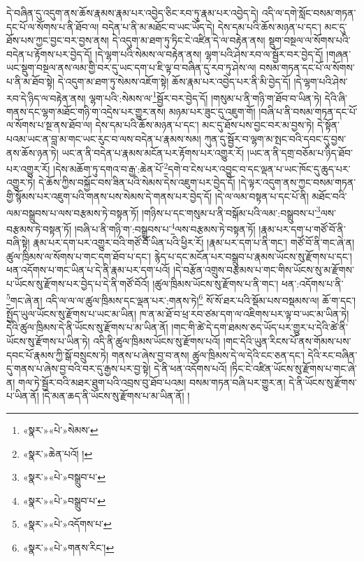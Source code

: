 དེ་བཞིན་དུ་འདུག་ནས་ཆོས་རྣམས་རྣམ་པར་འབྱེད་ཅིང་རབ་ཏུ་རྣམ་པར་འབྱེད་དེ། འདི་ལ་དགེ་སློང་བསམ་གཏན་དང་པོ་ལ་སོགས་པ་ནི་ཐོབ་ལ། བདེན་པ་ནི་མ་མཐོང་བ་ཡང་ཡོད་དེ། དེས་དམ་པའི་ཆོས་མཉན་པ་དང་། མང་དུ་ཐོས་པས་ཀྱང་བྱང་བར་བྱས་ནས། དེ་འདུག་མ་ཐག་ཏུ་ཏིང་ངེ་འཛིན་དེ་ལ་བརྟེན་ནས། སྡུག་བསྔལ་ལ་སོགས་པའི་བདེན་པ་རྟོགས་པར་བྱེད་དོ། །དེ་ལྷག་པའི་སེམས་ལ་བརྟེན་ནས། ལྷག་པའི་ཤེས་རབ་ལ་སྦྱོར་བར་བྱེད་དོ། །གཞན་ཡང་སྡུག་བསྔལ་ནས་ལམ་གྱི་བར་དུ་ཡང་དག་པ་ཇི་ལྟ་བ་བཞིན་དུ་རབ་ཏུ་ཤེས་ལ། བསམ་གཏན་དང་པོ་ལ་སོགས་པ་ནི་མ་ཐོབ་སྟེ། དེ་འདུག་མ་ཐག་ཏུ་སེམས་འཇོག་སྟེ། ཆོས་རྣམ་པར་འབྱེད་པར་ནི་མི་བྱེད་དོ། །དེ་ལྷག་པའི་ཤེས་རབ་དེ་ཉིད་ལ་བརྟེན་ནས། ལྷག་པའི་:སེམས་ལ་\footnote{«སྣར་»«པེ་»སེམས་}སྦྱོར་བར་བྱེད་དོ། །གསུམ་པ་ནི་གཉི་ག་ཐོབ་བ་ཡིན་ཏེ། དེའི་ཞི་གནས་དང་ལྷག་མཐོང་གཉི་ག་འདྲེས་པར་གྱུར་ནས། མཉམ་པར་ཟུང་དུ་འཇུག་གོ། །བཞི་པ་ནི་བསམ་གཏན་དང་པོ་ལ་སོགས་པ་སྔ་ནས་ཐོབ་ལ། དེས་དམ་པའི་ཆོས་མཉན་པ་དང་། མང་དུ་ཐོས་པས་བྱང་བར་མ་བྱས་ཏེ། དེ་སྟོན་པའམ་ཡང་ན་བླ་མ་གང་ཡང་རུང་བ་ལས་བདེན་པ་རྣམས་སམ། ཀུན་དུ་སྦྱོར་བ་ལྷག་མ་སྤང་བའི་དབང་དུ་བྱས་ནས་ཆོས་ཉན་ཏེ། ཡང་ན་ནི་བདེན་པ་རྣམས་མངོན་པར་རྟོགས་པར་འགྱུར་རོ། །ཡང་ན་ནི་དགྲ་བཅོམ་པ་ཉིད་ཐོབ་པར་འགྱུར་རོ། །དེས་མཆོག་ཏུ་དགའ་བ་རྒྱ་:ཆེན་པོ་\footnote{«སྣར་»ཆེན་པའོ། །}དགེ་བ་ངེས་པར་འབྱུང་བ་དང་ལྡན་པ་ཡང་ཁོང་དུ་ཆུད་པར་འགྱུར་ཏེ། དེ་ཆོས་ཀྱིས་བསྐྱོང་བས་ཟིན་པའི་སེམས་དེས་འཇུག་པར་བྱེད་དོ། །དེ་ལྟར་འདུག་ནས་ཀྱང་བསམ་གཏན་གྱི་སྙོམས་པར་འཇུག་པའི་གནས་པས་སེམས་དེ་གནས་པར་བྱེད་དོ། །དེ་ལ་ལམ་བསྟན་པ་དང་པོ་ནི། མཐོང་བའི་ལམ་བསྒྲུབས་པ་ལས་བརྩམས་ཏེ་བསྟན་ཏོ། །གཉིས་པ་དང་གསུམ་པ་ནི་བསྒོམ་པའི་ལམ་:བསྒྲུབས་པ་\footnote{«སྣར་»«པེ་»བསྒྲུབ་པ་}ལས་བརྩམས་ཏེ་བསྟན་ཏོ། །བཞི་པ་ནི་གཉི་ག་:བསྒྲུབས་པ་\footnote{«སྣར་»«པེ་»བསྒྲུབ་པ་}ལས་བརྩམས་ཏེ་བསྟན་ཏོ། །རྣམ་པར་དག་པ་གཙོ་བོ་ནི་བཞི་སྟེ། རྣམ་པར་དག་པར་འགྱུར་བའི་གཙོ་བོ་ཡིན་པའི་ཕྱིར་རོ། །རྣམ་པར་དག་པ་ནི་གང་། གཙོ་བོ་ནི་གང་ཞེ་ན། ཚུལ་ཁྲིམས་ལ་སོགས་པ་གང་དག་ཐོབ་པ་དང་། རྙེད་པ་དང་མངོན་པར་བསྒྲུབ་པ་རྣམས་ཡོངས་སུ་རྫོགས་པ་དང་། ཕན་འདོགས་པ་གང་ཡིན་པ་དེ་ནི་རྣམ་པར་དག་པའོ། །དེ་བརྩོན་འགྲུས་བརྩམས་པ་གང་གིས་ཡོངས་སུ་མ་རྫོགས་པ་ཡོངས་སུ་རྫོགས་པར་བྱེད་པ་དེ་ནི་གཙོ་བོའོ། །ཚུལ་ཁྲིམས་ཡོངས་སུ་རྫོགས་པ་ནི་གང་། ཕན་:འདོགས་པ་ནི་\footnote{«སྣར་»«པེ་»འདོགས་པ་}གང་ཞེ་ན། འདི་ལ་ལ་ལ་ཚུལ་ཁྲིམས་དང་ལྡན་པར་:གནས་ཏེ།\footnote{«སྣར་»«པེ་»གནས་རིང་།} སོ་སོ་ཐར་པའི་སྡོམ་པས་བསྡམས་ལ། ཆོ་ག་དང་། སྤྱོད་ཡུལ་ཡོངས་སུ་རྫོགས་པ་ཡང་མ་ཡིན། ཁ་ན་མ་ཐོ་བ་ཕྲ་རབ་ཙམ་དག་ལ་འཇིགས་པར་ལྟ་བ་ཡང་མ་ཡིན་ཏེ། དེའི་ཚུལ་ཁྲིམས་དེ་ནི་ཡོངས་སུ་རྫོགས་པ་མ་ཡིན་ནོ། །གང་གི་ཚེ་དེ་དག་ཐམས་ཅད་ཡོད་པར་གྱུར་པ་དེའི་ཚེ་ནི་ཡོངས་སུ་རྫོགས་པ་ཡིན་ཏེ། འདི་ནི་ཚུལ་ཁྲིམས་ཡོངས་སུ་རྫོགས་པའོ། །གང་དེའི་ཡུན་རིངས་པོ་ནས་གོམས་པས་དབང་པོ་རྣམས་ཀྱི་སྒོ་བསྲུངས་ཏེ། གནས་པ་ཞེས་བྱ་བ་ནས། ཚུལ་ཁྲིམས་དེ་ལ་དེའི་ངང་ཅན་དང་། དེའི་རང་བཞིན་དུ་གནས་པ་ཞེས་བྱ་བའི་བར་དུ་རྒྱས་པར་བྱ་སྟེ། དེ་ནི་ཕན་འདོགས་པའོ། །ཏིང་ངེ་འཛིན་ཡོངས་སུ་རྫོགས་པ་གང་ཞེ་ན། གལ་ཏེ་སྦྱོར་བའི་མཐར་ཐུག་པའི་འབྲས་བུ་ཐོབ་པའམ། བསམ་གཏན་བཞི་པར་གྱུར་ན། དེ་ནི་ཡོངས་སུ་རྫོགས་པ་ཡིན་ནོ། །དེ་མན་ཆད་ནི་ཡོངས་སུ་རྫོགས་པ་མ་ཡིན་ནོ། །
